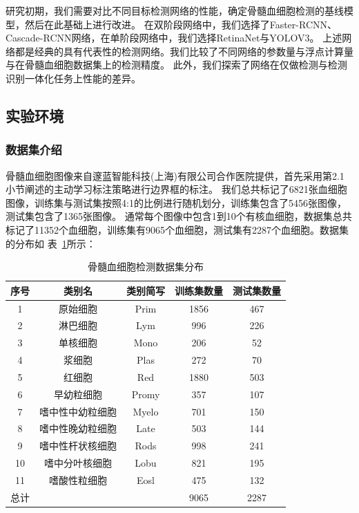 研究初期，我们需要对比不同目标检测网络的性能，确定骨髓血细胞检测的基线模型，然后在此基础上进行改进。
在双阶段网络中，我们选择了Faster-RCNN、Cascade-RCNN网络，在单阶段网络中，我们选择RetinaNet与YOLOV3。
上述网络都是经典的具有代表性的检测网络。我们比较了不同网络的参数量与浮点计算量与在骨髓血细胞数据集上的检测精度。
此外，我们探索了网络在仅做检测与检测识别一体化任务上性能的差异。

\subsection{实验环境}

\subsubsection{数据集介绍}

骨髓血细胞图像来自邃蓝智能科技(上海)有限公司合作医院提供，首先采用第2.1小节阐述的主动学习标注策略进行边界框的标注。
我们总共标记了6821张血细胞图像，训练集与测试集按照4:1的比例进行随机划分，训练集包含了5456张图像，测试集包含了1365张图像。
通常每个图像中包含1到10个有核血细胞，数据集总共标记了11352个血细胞，训练集有9065个血细胞，测试集有2287个血细胞。数据集的分布如
表~\ref{table:cell_detect}所示：

\begin{table}
  \caption{骨髓血细胞检测数据集分布}   
  \centering 
  \label{table:cell_detect}
  \begin{tabular}{ccccc}
    \toprule[2pt]
    序号 & 类别名  &  类别简写 & 训练集数量 & 测试集数量 \\
    \midrule[1.5pt] 
    1 & 原始细胞 & Prim & 1856 & 467 \\ 
    2 & 淋巴细胞 & Lym & 996 & 226   \\ 
    3 & 单核细胞 & Mono & 206 & 52   \\ 
    4 & 浆细胞 & Plas & 272 & 70   \\ 
    5 & 红细胞 & Red & 1880 & 503   \\ 
    6 & 早幼粒细胞 & Promy & 357 & 107   \\ 
    7 & 嗜中性中幼粒细胞 & Myelo & 701 & 150   \\ 
    8 & 嗜中性晚幼粒细胞 & Late & 503 & 144   \\ 
    9 & 嗜中性杆状核细胞 & Rods & 998 & 241   \\  
    10 & 嗜中分叶核细胞 & Lobu & 821 & 195   \\  
    11 & 嗜酸性粒细胞 & Eosl & 475 & 132   \\  
    \hline
    总计 &   &   & 9065 & 2287 \\
    \bottomrule[2pt]      
  \end{tabular} 
\end{table}

